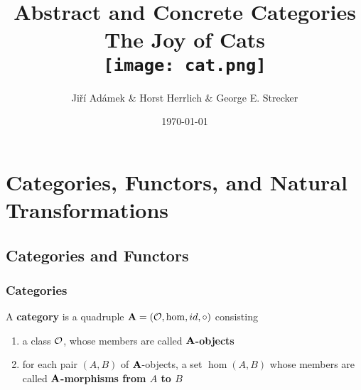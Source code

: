 \documentclass[11pt]{article}
\author{Jiří Adámek \& Horst Herrlich \& George E. Strecker}
\date{\today}
\title{\aunclfamily\Huge Abstract and Concrete Categories \\ The Joy of Cats \\ \texttt{[image: cat.png]}}
\begin{document}
\maketitle
\setcounter{tocdepth}{2}
\tableofcontents \clearpage\section{Categories, Functors, and Natural Transformations}
\label{sec:org367830c}
\subsection{Categories and Functors}
\label{sec:org0d7482a}
\subsubsection{Categories}
\label{sec:orgeb4f845}
\begin{definition}[]
A \textbf{category} is a quadruple \(\operatorname{\textbf{A}}=(\mathcal{O},\operatorname{hom},id,\circ)\) consisting
\begin{enumerate}
\item a class \(\mathcal{O}\), whose members are called \textbf{\(\operatorname{\textbf{A}}\)-objects}
\item for each pair \((A,B)\) of \(\operatorname{\textbf{A}}\)-objects, a set \(\hom(A,B)\) whose
members are called \textbf{\(\operatorname{\textbf{A}}\)-morphisms from \(A\) to \(B\)}
\end{enumerate}
\end{definition}
\end{document}
